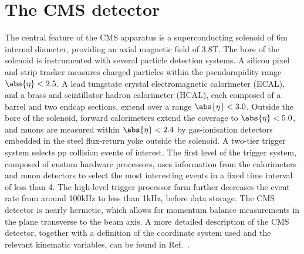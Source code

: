 \section{The CMS detector}
\label{sec:detector}


The central feature of the CMS apparatus is a superconducting solenoid
of 6\unit{m} internal diameter, providing an axial magnetic field of
3.8\unit{T}. The bore of the solenoid is instrumented with several
particle detection systems. A silicon pixel and strip tracker measures
charged particles within the pseudorapidity range $\abs{\eta} < 2.5$.
A lead tungstate crystal electromagnetic calorimeter (ECAL), and a
brass and scintillator hadron calorimeter (HCAL), each composed of a
barrel and two endcap sections, extend over a range $\abs{\eta} <
3.0$. %
Outside the bore of the solenoid, forward calorimeters extend the
coverage to $\abs{\eta} < 5.0$, and muons are measured within
$\abs{\eta} < 2.4$ by gas-ionisation detectors embedded in the steel
flux-return yoke outside the solenoid. A two-tier trigger system
selects pp collision events of interest. The first level of the
trigger system, composed of custom hardware processors, uses
information from the calorimeters and muon detectors to select the
most interesting events in a fixed time interval of less than
4\mus. The high-level trigger processor farm further decreases the
event rate from around 100\unit{kHz} to less than 1\unit{kHz}, before
data storage. The CMS detector is nearly hermetic, which allows for
momentum balance measurements in the plane transverse to the beam
axis. A more detailed description of the CMS detector, together with a
definition of the coordinate system used and the relevant kinematic
variables, can be found in Ref.~\cite{Chatrchyan:2008zzk}.

